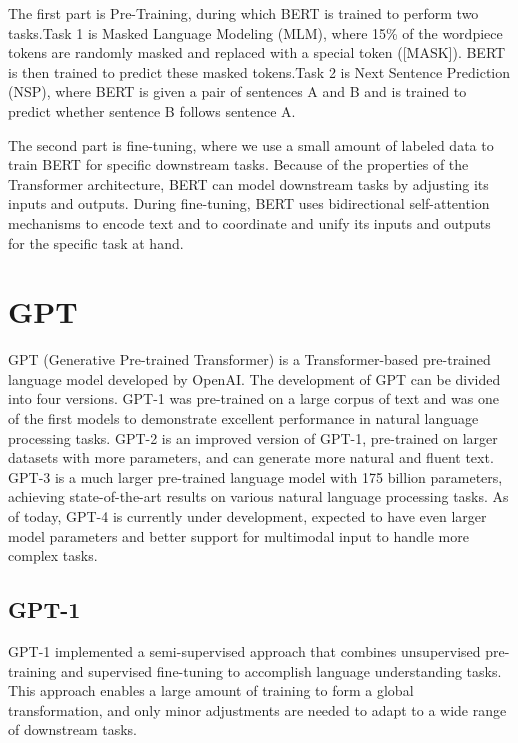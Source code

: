 \documentclass[conference]{IEEEtran}
\begin{document}
\par The first part is Pre-Training, during which BERT 
is trained to perform two tasks.Task 1 is Masked Language Modeling (MLM), where 
15\% of the wordpiece tokens are randomly masked and replaced with a special token ([MASK]). 
BERT is then trained to predict these masked tokens.Task 2 is Next Sentence Prediction (NSP), 
where BERT is given a pair of sentences A and B and is trained to predict whether 
sentence B follows sentence A.

\par The second part is fine-tuning, where we use a small amount of 
labeled data to train BERT for specific downstream tasks. Because of the properties of 
the Transformer architecture, BERT can model downstream tasks by adjusting its inputs and 
outputs. During fine-tuning, BERT uses bidirectional self-attention mechanisms to encode 
text and to coordinate and unify its inputs and outputs for the specific task at hand.

\section{GPT}

\par GPT\cite{b3} (Generative Pre-trained Transformer) is a Transformer-based pre-trained language 
model developed by OpenAI. The development of GPT can be divided into four versions. 
GPT-1 was pre-trained on a large corpus of text and was one of the first models to 
demonstrate excellent performance in natural language processing tasks. GPT-2 is an 
improved version of GPT-1, pre-trained on larger datasets with more parameters, and 
can generate more natural and fluent text. GPT-3 is a much larger pre-trained language 
model with 175 billion parameters, achieving state-of-the-art results on various natural 
language processing tasks. As of today, GPT-4 is currently under development, expected 
to have even larger model parameters and better support for multimodal input to handle 
more complex tasks.

\subsection{GPT-1}

\par GPT-1\cite{b3} implemented a semi-supervised approach that combines unsupervised pre-training 
and supervised fine-tuning to accomplish language understanding tasks. This approach 
enables a large amount of training to form a global transformation, and only minor 
adjustments are needed to adapt to a wide range of downstream tasks.
\end{document}

